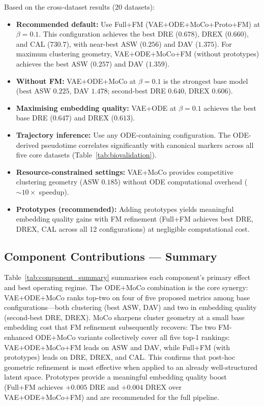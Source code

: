 \documentclass[journal]{IEEEtran}
\begin{document}
Based on the cross-dataset results (20 datasets):
\begin{itemize}
    \item \textbf{Recommended default:} Use Full+FM (VAE+ODE+MoCo+Proto+FM) at $\beta{=}0.1$. This configuration achieves the best DRE ($0.678$), DREX ($0.660$), and CAL ($730.7$), with near-best ASW ($0.256$) and DAV ($1.375$). For maximum clustering geometry, VAE+ODE+MoCo+FM (without prototypes) achieves the best ASW ($0.257$) and DAV ($1.359$).
    \item \textbf{Without FM:} VAE+ODE+MoCo at $\beta{=}0.1$ is the strongest base model (best ASW $0.225$, DAV $1.478$; second-best DRE $0.640$, DREX $0.606$).
    \item \textbf{Maximising embedding quality:} VAE+ODE at $\beta{=}0.1$ achieves the best base DRE ($0.647$) and DREX ($0.613$).
    \item \textbf{Trajectory inference:} Use any ODE-containing configuration. The ODE-derived pseudotime correlates significantly with canonical markers across all five core datasets (Table~\ref{tab:biovalidation}).
    \item \textbf{Resource-constrained settings:} VAE+MoCo provides competitive clustering geometry (ASW $0.185$) without ODE computational overhead (${\sim}10\times$ speedup).
    \item \textbf{Prototypes (recommended):} Adding prototypes yields meaningful embedding quality gains with FM refinement (Full+FM achieves best DRE, DREX, CAL across all 12 configurations) at negligible computational cost.
\end{itemize}

\subsection{Component Contributions --- Summary}
\label{sec:discussion:summary}

Table~\ref{tab:component_summary} summarises each component's primary effect and best operating regime. The ODE+MoCo combination is the core synergy: VAE+ODE+MoCo ranks top-two on four of five proposed metrics among base configurations---both clustering (best ASW, DAV) and two in embedding quality (second-best DRE, DREX). MoCo sharpens cluster geometry at a small base embedding cost that FM refinement subsequently recovers: The two FM-enhanced ODE+MoCo variants collectively cover all five top-1 rankings: VAE+ODE+MoCo+FM leads on ASW and DAV, while Full+FM (with prototypes) leads on DRE, DREX, and CAL. This confirms that post-hoc geometric refinement is most effective when applied to an already well-structured latent space. Prototypes provide a meaningful embedding quality boost (Full+FM achieves $+0.005$ DRE and $+0.004$ DREX over VAE+ODE+MoCo+FM) and are recommended for the full pipeline.
\end{document}
